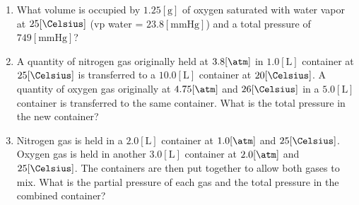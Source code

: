 \documentclass[12pt]{article}
\begin{document}
\begin{enumerate}
  \item What volume is occupied by $1.25[\si{\gram}]$ of oxygen saturated with water vapor at $25[\si{\Celsius}]$ (vp water = $23.8[\si{\mmHg}]$) and a total pressure of $749[\si{\mmHg}]$? 

  \item A quantity of nitrogen gas originally held at $3.8[\si{\atm}]$ in $1.0[\si{\liter}]$ container at $25[\si{\Celsius}]$ is transferred to a $10.0[\si{\liter}]$ container at $20[\si{\Celsius}]$.  A quantity of oxygen gas originally at $4.75[\si{\atm}]$ and $26[\si{\Celsius}]$ in a $5.0[\si{\liter}]$ container is transferred to the same container.  What is the total pressure in the new container? 

  \item Nitrogen gas is held in a $2.0[\si{\liter}]$ container at $1.0[\si{\atm}]$ and $25[\si{\Celsius}]$.  Oxygen gas is held in another $3.0[\si{\liter}]$ container at $2.0[\si{\atm}]$ and $25[\si{\Celsius}]$.  The containers are then put together to allow both gases to mix.  What is the partial pressure of each gas and the total pressure in the combined container?

\end{enumerate}
\end{document}

